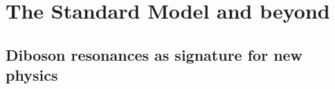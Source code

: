 \chapter{The Standard Model and beyond}
\label{ch:BSM}

  

  
  
 \section{Diboson resonances as signature for new physics} 